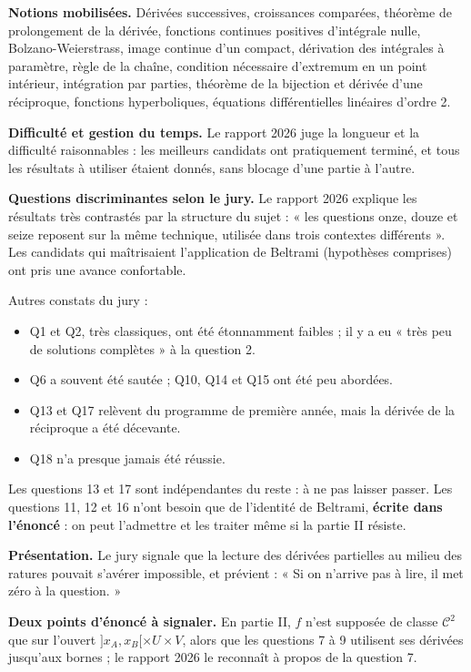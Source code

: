 \documentclass[11pt,a4paper]{article}
\providecommand{\tightlist}{\setlength{\itemsep}{0pt}\setlength{\parskip}{0pt}}
\begin{document}
\textbf{Notions mobilisées.} Dérivées successives, croissances comparées, théorème de prolongement de la dérivée, fonctions continues positives d'intégrale nulle, Bolzano-Weierstrass, image continue d'un compact, dérivation des intégrales à paramètre, règle de la chaîne, condition nécessaire d'extremum en un point intérieur, intégration par parties, théorème de la bijection et dérivée d'une réciproque, fonctions hyperboliques, équations différentielles linéaires d'ordre 2.

\textbf{Difficulté et gestion du temps.} Le rapport 2026 juge la longueur et la difficulté raisonnables : les meilleurs candidats ont pratiquement terminé, et tous les résultats à utiliser étaient donnés, sans blocage d'une partie à l'autre.

\textbf{Questions discriminantes selon le jury.} Le rapport 2026 explique les résultats très contrastés par la structure du sujet : « les questions onze, douze et seize reposent sur la même technique, utilisée dans trois contextes différents ». Les candidats qui maîtrisaient l'application de Beltrami (hypothèses comprises) ont pris une avance confortable.

Autres constats du jury :

\begin{itemize}
\tightlist
\item
  Q1 et Q2, très classiques, ont été étonnamment faibles ; il y a eu « très peu de solutions complètes » à la question 2.
\item
  Q6 a souvent été sautée ; Q10, Q14 et Q15 ont été peu abordées.
\item
  Q13 et Q17 relèvent du programme de première année, mais la dérivée de la réciproque a été décevante.
\item
  Q18 n'a presque jamais été réussie.
\end{itemize}

Les questions 13 et 17 sont indépendantes du reste : à ne pas laisser passer. Les questions 11, 12 et 16 n'ont besoin que de l'identité de Beltrami, \textbf{écrite dans l'énoncé} : on peut l'admettre et les traiter même si la partie II résiste.

\textbf{Présentation.} Le jury signale que la lecture des dérivées partielles au milieu des ratures pouvait s'avérer impossible, et prévient : « Si on n'arrive pas à lire, il met zéro à la question. »

\textbf{Deux points d'énoncé à signaler.} En partie II, \(f\) n'est supposée de classe \(\mathcal C^2\) que sur l'ouvert \(]x_A,x_B[\times U\times V\), alors que les questions 7 à 9 utilisent ses dérivées jusqu'aux bornes ; le rapport 2026 le reconnaît à propos de la question 7.
\end{document}
